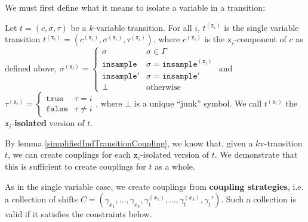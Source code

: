 We must first define what it means to isolate a variable in a transition: 

\begin{defn}
    Let $t = (c, \sigma, \tau)$ be a $k$-variable transition. For all $i$, $t^{(\texttt{x}_i)}$ is the single variable transition $t^{(\texttt{x}_i)} = (c^{(\texttt{x}_i)}, \sigma^{(\texttt{x}_i)}, \tau^{(\texttt{x}_i)})$, where $c^{(\texttt{x}_i)}$ is the $\texttt{x}_i$-component of $c$ as defined above, $\sigma^{(\texttt{x}_i)} = \begin{cases}
        \sigma & \sigma \in \Gamma\\
        \texttt{insample} & \sigma = \texttt{insample}^{(\texttt{x}_i)}\\
        \texttt{insample}' & \sigma = \texttt{insample}'\\
        \bot & \text{otherwise}
    \end{cases}$ and $\tau^{(\texttt{x}_i)} = \begin{cases}
        \texttt{true} & \tau = i\\
        \texttt{false} & \tau \neq i
    \end{cases}$, where $\bot$ is a unique ``junk'' symbol. We call $t^{(\texttt{x}_i)}$ the $\texttt{x}_i$-\textbf{isolated} version of $t$. 
\end{defn}

By lemma \ref{simplifiedIndTransitionCoupling}, we know that, given a $k$v-transition $t$, we can create couplings for each $\texttt{x}_i$-isolated version of $t$. We demonstrate that this is sufficient to create couplings for $t$ as a whole. 

As in the single variable case, we create couplings from \textbf{coupling strategies}, i.e. a collection of shifts $C = (\gamma_{x_1}, \ldots, \gamma_{x_k}, \gamma_t^{(x_1)}, \ldots, \gamma_t^{(x_k)}, \gamma_t')$. Such a collection is valid if it satisfies the constraints below. 


